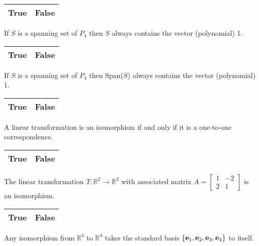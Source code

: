 \documentclass[10pt]{exam}
\begin{document}
\begin{questions}
\begin{choices}
\choice \begin{tabular}{|c|c|}\hline True & False \\ \hline \end{tabular} If $S$ is a spanning set of $P_4$ then $S$ always contains the vector (polynomial) 1.  
\choice \begin{tabular}{|c|c|}\hline True & False \\ \hline \end{tabular} If $S$ is a spanning set of $P_4$ then Span($S$) always contains the vector (polynomial) 1.
\choice \begin{tabular}{|c|c|}\hline True & False \\ \hline \end{tabular} A linear transformation is an isomorphism if and only if it is a one-to-one correspondence.
\choice \begin{tabular}{|c|c|}\hline True & False \\ \hline \end{tabular} The linear transformation $T{:}\mathbb{R}^2 \rightarrow \mathbb{R}^2$ with associated matrix $A=\left[\begin{array}{rr} 1 & -2 \\ 2 & 1 \end{array} \right]$ is an isomorphism. 
\choice \begin{tabular}{|c|c|}\hline True & False \\ \hline \end{tabular} Any isomorphism from $\mathbb{R}^4$ to $\mathbb{R}^4$ takes the standard basis $\{{\bf e}_1,{\bf e}_2,{\bf e}_3,{\bf e}_4 \}$ to itself.
\end{choices}
\end{questions}
\end{document}
